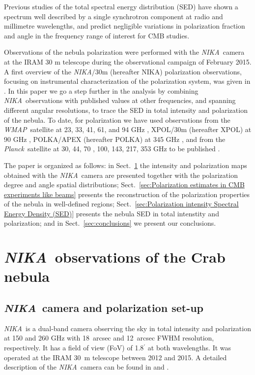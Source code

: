 \documentclass[twocolumn,traditabstract]{aa}
\def\NIKA{\textit{NIKA}}
\def\Planck{\textit{Planck}}
\def\WMAP{\textit{WMAP}}
\begin{document}
Previous studies \citep{macias2010} of the total spectral energy distribution
(SED) have shown a spectrum well described by a single
synchrotron component at radio and millimetre wavelengths, and predict negligible
variations in polarization fraction and angle in the frequency range of interest
for CMB studies.
 
Observations of the  nebula polarization were performed with the \NIKA\ camera   \citep{monfardini2010,catalano2014,monfardini2014} at the IRAM 30
m telescope  during the observational campaign of February 2015. A first
overview of the  \NIKA/30m (hereafter NIKA)    polarization observations,
focusing on instrumental characterization of the polarization system, was given in
\cite{2016JLTP..184..724R}. In this paper we go a step further in the analysis
by combining \NIKA\ observations with published values at other frequencies, and spanning different angular resolutions, to trace the
SED in total intensity and polarization of the  nebula. To date, for polarization we have used observations from the \WMAP\
satellite at 23, 33, 41, 61, and 94 GHz \citep{2011ApJS..192...19W}, XPOL/30m (hereafter XPOL) at 90 GHz
\citep{aumont2010}, POLKA/APEX (hereafter POLKA) at 345 GHz \citep{2014PASP..126.1027W}, and from the
\Planck\ satellite at 30, 44, 70 \citep{2015arXiv150702058P}, 100, 143, 217, 353 GHz to be published \citep{planck2018}.

The paper is organized as follows: in Sect.~\ref{sec:NIKA observations} the
intensity and polarization maps obtained with the \NIKA\ camera are presented
together with the polarization degree and angle spatial distributions;
Sect.~\ref{sec:Polarization estimates in CMB experiments like beams} presents the
reconstruction of the polarization properties of the  nebula in well-defined
regions; Sect.~\ref{sec:Polarization intensity Spectral Energy Density (SED)}
presents the \object{Crab} nebula SED in total intenstity and polarization; and in
Sect.~\ref{sec:conclusions} we present our conclusions.
 
\section{\NIKA\ observations of the Crab nebula}\label{sec:NIKA observations}
\subsection{\NIKA\ camera and polarization set-up}\label{sec:nika camera}
\NIKA\ is a dual-band camera observing the sky in total intensity and polarization at
150 and 260 GHz with 18~arcsec and 12~arcsec FWHM resolution, respectively. It
has a field of view (FoV) of 1.8$^{\prime}$ at both wavelengths. It was operated at the
IRAM 30~m telescope between 2012 and 2015. A detailed description of the
\NIKA\ camera can be found in \citet{monfardini2010, monfardini2011} and
\citet{catalano2014}.
\end{document}
